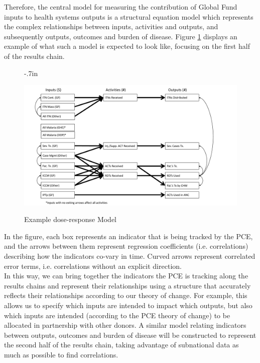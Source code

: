 \documentclass[twocolumn]{bmcart}%
\begin{document}
Therefore, the central model for measuring the contribution of Global Fund inputs to health systems outputs is a structural equation model which represents the complex relationships between inputs, activities and outputs, and subsequently outputs, outcomes and burden of disease. Figure \ref{fig2} displays an example of what such a model is expected to look like, focusing on the first half of the results chain. \\
\begin{figure}[h]
  \advance\leftskip-.7in
  \caption{\textmd{Example dose-response Model}}
  \includegraphics[scale=.35]{SEM_Diagram_Malaria.pdf} \\
  \label{fig2}
\end{figure}

In the figure, each box represents an indicator that is being tracked by the PCE, and the arrows between them represent regression coefficients (i.e. correlations) describing how the indicators co-vary in time. Curved arrows represent correlated error terms, i.e. correlations without an explicit direction. \\

In this way, we can bring together the indicators the PCE is tracking along the results chains and represent their relationships using a structure that accurately reflects their relationships according to our theory of change. For example, this allows us to specify which inputs are intended to impact which outputs, but also which inputs are intended (according to the PCE theory of change) to be allocated in partnership with other donors. A similar model relating indicators between outputs, outcomes and burden of disease will be constructed to represent the second half of the results chain, taking advantage of subnational data as much as possible to find correlations. \\
\end{document}
